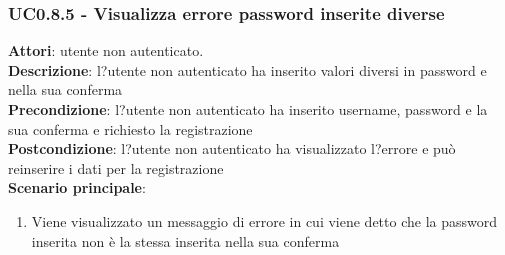 	\subsubsection{UC0.8.5 - Visualizza errore password inserite diverse} {
		\label{uc0.8.5}
		\textbf{Attori}: utente non autenticato. \\
		\textbf{Descrizione}: l?utente non autenticato ha inserito valori diversi in password e nella sua conferma	\\
		\textbf{Precondizione}: l?utente non autenticato ha inserito username, password e la sua conferma e richiesto la registrazione	\\
		\textbf{Postcondizione}: l?utente non autenticato ha visualizzato l?errore e può reinserire i dati per la registrazione  \\
		\textbf{Scenario principale}:
		\begin{enumerate}
			\item Viene visualizzato un messaggio di errore in cui viene detto che  la password inserita non è la stessa inserita nella sua conferma
		\end{enumerate}
		}

		
		
		
		
		
		
		
		
		
		
		
		